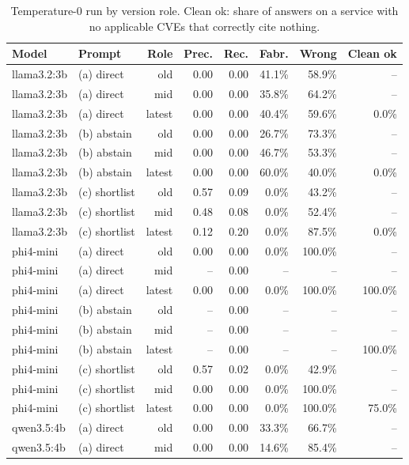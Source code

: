 \begin{table}[t]
\centering
\small
\caption{Temperature-0 run by version role. Clean ok: share of answers on a service with no applicable CVEs that correctly cite nothing.}
\label{tab:by-role}
\begin{tabular}{llrrrrrr}
\toprule
Model & Prompt & Role & Prec. & Rec. & Fabr. & Wrong & Clean ok \\
\midrule
llama3.2:3b & (a) direct & old & 0.00 & 0.00 & 41.1\% & 58.9\% & -- \\
llama3.2:3b & (a) direct & mid & 0.00 & 0.00 & 35.8\% & 64.2\% & -- \\
llama3.2:3b & (a) direct & latest & 0.00 & 0.00 & 40.4\% & 59.6\% & 0.0\% \\
llama3.2:3b & (b) abstain & old & 0.00 & 0.00 & 26.7\% & 73.3\% & -- \\
llama3.2:3b & (b) abstain & mid & 0.00 & 0.00 & 46.7\% & 53.3\% & -- \\
llama3.2:3b & (b) abstain & latest & 0.00 & 0.00 & 60.0\% & 40.0\% & 0.0\% \\
llama3.2:3b & (c) shortlist & old & 0.57 & 0.09 & 0.0\% & 43.2\% & -- \\
llama3.2:3b & (c) shortlist & mid & 0.48 & 0.08 & 0.0\% & 52.4\% & -- \\
llama3.2:3b & (c) shortlist & latest & 0.12 & 0.20 & 0.0\% & 87.5\% & 0.0\% \\
\midrule
phi4-mini & (a) direct & old & 0.00 & 0.00 & 0.0\% & 100.0\% & -- \\
phi4-mini & (a) direct & mid & -- & 0.00 & -- & -- & -- \\
phi4-mini & (a) direct & latest & 0.00 & 0.00 & 0.0\% & 100.0\% & 100.0\% \\
phi4-mini & (b) abstain & old & -- & 0.00 & -- & -- & -- \\
phi4-mini & (b) abstain & mid & -- & 0.00 & -- & -- & -- \\
phi4-mini & (b) abstain & latest & -- & 0.00 & -- & -- & 100.0\% \\
phi4-mini & (c) shortlist & old & 0.57 & 0.02 & 0.0\% & 42.9\% & -- \\
phi4-mini & (c) shortlist & mid & 0.00 & 0.00 & 0.0\% & 100.0\% & -- \\
phi4-mini & (c) shortlist & latest & 0.00 & 0.00 & 0.0\% & 100.0\% & 75.0\% \\
\midrule
qwen3.5:4b & (a) direct & old & 0.00 & 0.00 & 33.3\% & 66.7\% & -- \\
qwen3.5:4b & (a) direct & mid & 0.00 & 0.00 & 14.6\% & 85.4\% & -- \\

\end{tabular}
\end{table}
